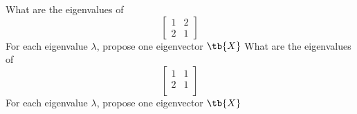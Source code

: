 \bexo
What are the eigenvalues of 
\begin{equation*}
\left[
\begin{array}{cc}
1 & 2 \\
2 & 1
\end{array}
\right]
\end{equation*}
For each eigenvalue $\lambda$, propose one eigenvector $\tb{X}$
\eexo{}
\bexo
What are the eigenvalues of 
\begin{equation*}
\left[
\begin{array}{cc}
1 & 1\\
2 & 1\\
\end{array}
\right]
\end{equation*}
For each eigenvalue $\lambda$, propose one eigenvector $\tb{X}$
\eexo{}

